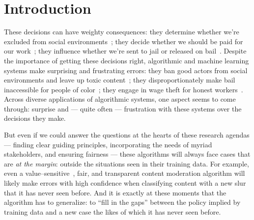 \documentclass[main]{subfiles}
\begin{document}
\section{Introduction}

These decisions can have weighty consequences:
they determine whether we're excluded from social environments~\cite{gillespie2018custodians,geiger2010work};
they decide whether we should be paid for our work~\cite{takingAHITMcInnis};
they influence whether we're sent to jail or released on bail~\cite{huq2018racial}.
Despite the importance of getting these decisions right,
algorithmic and machine learning systems make surprising and frustrating errors:
they ban good actors from social environments and leave up toxic content~\cite{halfaker2013rise,chancellor2016thyghgapp};
they disproportionately make bail inaccessible for people of color~\cite{propublica};
they engage in wage theft for honest workers~\cite{takingAHITMcInnis}.
Across diverse applications of algorithmic systems,
one aspect seems to come through:
surprise and
--- quite often ---
frustration with these systems over the decisions they make.

But even if we could answer the questions at the hearts of these research agendas
--- finding clear guiding principles,
    incorporating the needs of myriad stakeholders, and
    ensuring fairness ---
these algorithms will always face cases that are \textit{at the margin}:
outside the situations seen in their training data.
For example, even a value--sensitive~\cite{zhuvalue}, fair, and transparent content moderation algorithm will likely
make errors with high confidence when classifying content with a new slur that it has never seen before.
And it is exactly at these moments that the algorithm has to generalize:
to ``fill in the gaps'' between the policy implied by training data and
a new case the likes of which it has never seen before.
\end{document}

